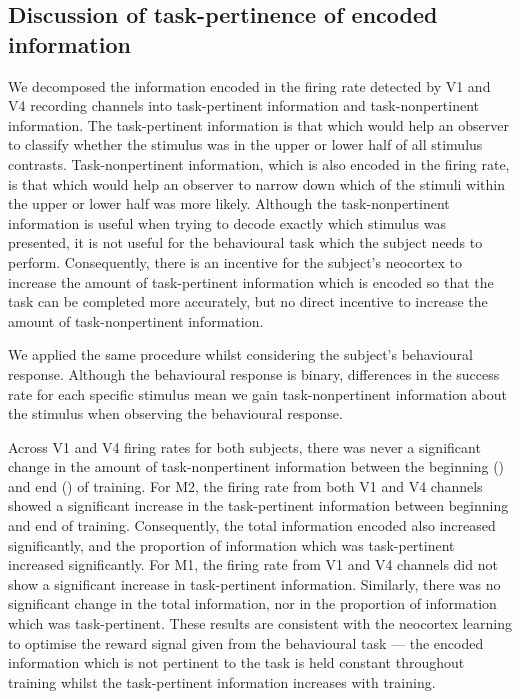 \subsection{Discussion of task-pertinence of encoded information}

We decomposed the information encoded in the firing rate detected by \ac{V1} and \ac{V4} recording channels into task-pertinent information and task-nonpertinent information.
The task-pertinent information is that which would help an observer to classify whether the stimulus was in the upper or lower half of all stimulus contrasts.
Task-nonpertinent information, which is also encoded in the firing rate, is that which would help an observer to narrow down which of the stimuli within the upper or lower half was more likely.
Although the task-nonpertinent information is useful when trying to decode exactly which stimulus was presented, it is not useful for the behavioural task which the subject needs to perform.
Consequently, there is an incentive for the subject's neocortex to increase the amount of task-pertinent information which is encoded so that the task can be completed more accurately, but no direct incentive to increase the amount of task-nonpertinent information.

We applied the same procedure whilst considering the subject's behavioural response.
Although the behavioural response is binary, differences in the success rate for each specific stimulus mean we gain task-nonpertinent information about the stimulus when observing the behavioural response.

Across \ac{V1} and \ac{V4} firing rates for both subjects, there was never a significant change in the amount of task-nonpertinent information between the beginning () and end () of training.
For \ac{M2}, the firing rate from both \ac{V1} and \ac{V4} channels showed a significant increase in the task-pertinent information between beginning and end of training.
Consequently, the total information encoded also increased significantly, and the proportion of information which was task-pertinent increased significantly.
For \ac{M1}, the firing rate from \ac{V1} and \ac{V4} channels did not show a significant increase in task-pertinent information.
Similarly, there was no significant change in the total information, nor in the proportion of information which was task-pertinent.
These results are consistent with the neocortex learning to optimise the reward signal given from the behavioural task --- the encoded information which is not pertinent to the task is held constant throughout training whilst the task-pertinent information increases with training.

